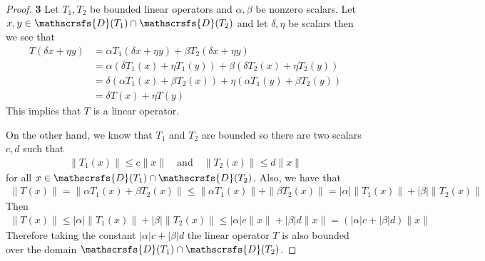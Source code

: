 \documentclass[11pt]{article}
\newcommand{\dom}{\mathscrsfs{D}}
\theoremstyle{definition}
\begin{document}
\cleardoublepage
\begin{proof}{\textbf{3}}
    Let $T_1,T_2$ be bounded linear operators and $\alpha, \beta$ be nonzero
    scalars. Let $x,y \in \dom(T_1) \cap \dom(T_2)$ and let $\delta, \eta$ be
    scalars then we see that
    \begin{align*}
        T(\delta x + \eta y)
        &= \alpha T_1(\delta x + \eta y) + \beta T_2(\delta x + \eta y)\\
        &= \alpha (\delta T_1(x) + \eta T_1(y)) + \beta (\delta T_2(x) + \eta T_2(y))\\
        &= \delta (\alpha T_1(x) + \beta T_2(x)) + \eta (\alpha T_1(y) + \beta T_2(y))\\
        &= \delta T(x) + \eta T(y)
    \end{align*}
    This implies that $T$ is a linear operator.

    On the other hand, we know that $T_1$ and $T_2$ are bounded so there are two
    scalars $c,d$ such that
    \begin{align*}
        \|T_1(x)\| \leq c\|x\| \quad\text{and}\quad \|T_2(x)\| \leq d\|x\|
    \end{align*}
    for all $x \in \dom(T_1) \cap \dom(T_2)$. Also, we have that
    \begin{align*}
        \|T(x)\| = \|\alpha T_1(x) + \beta T_2(x)\|
        \leq \|\alpha T_1(x)\| + \|\beta T_2(x)\| = |\alpha|\|T_1(x)\| + |\beta|\|T_2(x)\|
    \end{align*}
    Then
    \begin{align*}
        \|T(x)\| \leq |\alpha|\|T_1(x)\| + |\beta|\|T_2(x)\|
        \leq |\alpha|c\|x\| + |\beta|d\|x\| = (|\alpha|c + |\beta|d)\|x\| 
    \end{align*}
    Therefore taking the constant $|\alpha|c + |\beta|d$ the linear operator
    $T$ is also bounded over the domain $\dom(T_1) \cap \dom(T_2)$.
\end{proof}
\cleardoublepage
\end{document}
